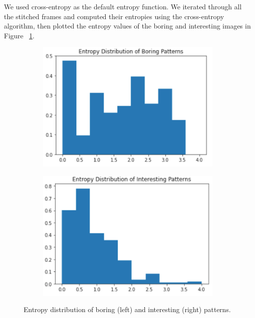 \documentclass[12pt]{article}
\numberwithin{figure}{section} %
\begin{document}
We used cross-entropy as the default entropy function. We iterated through all the stitched frames and computed their entropies using the cross-entropy algorithm, then plotted the entropy values of the boring and interesting images in Figure ~\ref{fig:entropy distribution}. 
\begin{figure}[H]
	\begin{subfigure}{0.5 \textwidth}
		\centering
		\includegraphics[width=\linewidth]{Section3/4.1}
	\end{subfigure}
	\begin{subfigure}{0.5 \textwidth}
		\centering
		\includegraphics[width=\linewidth]{Section3/4.2}
	\end{subfigure}
	\caption[Entropy distribution of patterns]{Entropy distribution of boring (left) and interesting (right) patterns.}
	\label{fig:entropy distribution}
	\vspace{-1.5em}
\end{figure}
\end{document}
